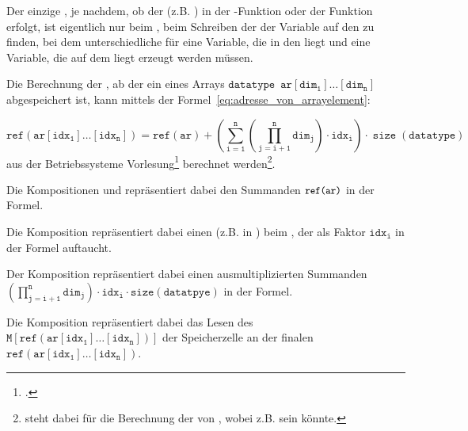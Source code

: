 Der einzige , je nachdem, ob der  (z.B. ) in der  -Funktion oder der Funktion  erfolgt, ist eigentlich nur beim , beim Schreiben der  der Variable  auf den  zu finden, bei dem unterschiedliche  für eine Variable, die in den  liegt und eine Variable, die auf dem  liegt erzeugt werden müssen.

\begin{Special_Paragraph}
  Die Berechnung der , ab der ein  eines Arrays $\mathtt{datatype\enspace ar[dim_1]\ldots[dim_n]}$ abgespeichert ist, kann mittels der Formel~\ref{eq:adresse_von_arrayelement}:


  \begin{equation}
  \mathtt{ref(ar[idx_1]\ldots[idx_n]) = ref(ar) + \left(\sum_{i=1}^{n}\left(\prod_{j=i+1}^{n} dim_{j}\right) \cdot idx_{i}\right) \cdot \operatorname{size}(datatype)}
    \label{eq:adresse_von_arrayelement}
  \end{equation}
  aus der Betriebssysteme Vorlesung\footcite{scholl_betriebssysteme_2020} berechnet werden\footnote{ steht dabei für die Berechnung der  von , wobei  z.B.  sein könnte.}.

  Die Kompositionen  und  repräsentiert dabei den Summanden ${\small\texttt{ref(ar)}}$ in der Formel.

  Die Komposition  repräsentiert dabei einen  (z.B.  in ) beim , der als Faktor $\mathtt{idx_i}$ in der Formel auftaucht.

  Der Komposition  repräsentiert dabei einen ausmultiplizierten Summanden $\mathtt{\left(\prod_{j=i+1}^{n} dim_{j}\right) \cdot idx_{i} \cdot size(datatpye)}$ in der Formel.

Die Komposition  repräsentiert dabei das Lesen des  $\mathtt{M\left[ref(ar[idx_1]\ldots[idx_n])\right]}$ der Speicherzelle an der finalen   $\mathtt{ref(ar[idx_1]\ldots[idx_n])}$.
\end{Special_Paragraph}

